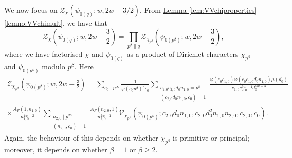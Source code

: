 \documentclass[11pt,a4paper]{amsart}
\newcommand{\VV}{\mathcal{V}}
\newcommand{\ZZ}{\mathcal{Z}}
\numberwithin{equation}{section}
\theoremstyle{remark}
\theoremstyle{definition}
\begin{document}
We now focus on $\ZZ_{\chi}(\psi_{0(q)};w,2w - 3/2)$. From \hyperref[lemno:VVchimult]{Lemma \ref*{lem:VVchiproperties} \ref*{lemno:VVchimult}}, we have that
\begin{equation}
\label{eqn:ZZchipsiww-32defeq1}
\ZZ_{\chi}\left(\psi_{0(q)};w,2w - \frac{3}{2}\right) = \prod_{p^{\beta} \parallel q} \ZZ_{\chi_{p^{\beta}}}\left(\psi_{0(p^{\beta})};w,2w - \frac{3}{2}\right),
\end{equation}
where we have factorised $\chi$ and $\psi_{0(q)}$ as a product of Dirichlet characters $\chi_{p^{\beta}}$ and $\psi_{0(p^{\beta})}$ modulo $p^{\beta}$. Here
\begin{multline}
\label{eqn:ZZchipsiww-32defeq2}
\ZZ_{\chi_{p^{\beta}}}\left(\psi_{0(p^{\beta})};w,2w - \frac{3}{2}\right) = \sum_{c_0 \mid p^{\infty}} \frac{1}{\varphi(c_0 p^{\beta})^2 c_0} \sum_{\substack{c_{1,0} c_{2,0} d_0 n_{1,0} = p^{\beta} \\ (c_{2,0} d_0 n_{1,0},c_0) = 1}} \frac{\varphi(c_0 c_{1,0}) \varphi(c_0 c_{1,0} d_0 n_{1,0}) \mu(d_0)}{c_{1,0} c_{2,0}^{6w - 4} d_0^{6w - 3}}	\\
\times \frac{A_F(1,n_{1,0})}{n_{1,0}^{4w - 2}} \sum_{\substack{n_{2,0} \mid p^{\infty} \\ (n_{2,0},c_0) = 1}} \frac{A_F(n_{2,0},1)}{n_{2,0}^{2w - 1}} \VV_{\chi_{p^{\beta}}}(\psi_{0(p^{\beta})}; c_{2,0} d_0 n_{1,0}, c_{2,0} d_0^2 n_{1,0} n_{2,0}, c_{2,0}, c_0).
\end{multline}
Again, the behaviour of this depends on whether $\chi_{p^{\beta}}$ is primitive or principal; moreover, it depends on whether $\beta = 1$ or $\beta \geq 2$.
\end{document}
